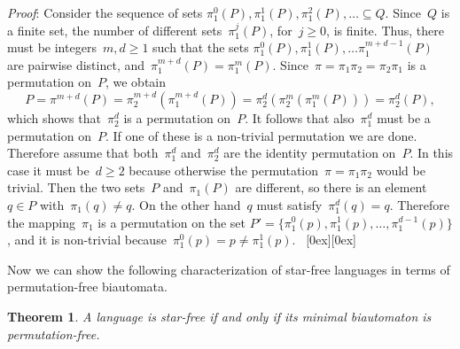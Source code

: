 \documentclass[submission]{eptcs}
\newcommand*{\qed}{\raisebox{0.5ex}[0ex][0ex]{\framebox[1ex][l]{}}}
\newtheorem{theorem}{Theorem}
\newenvironment{proof}{\par\noindent
  {\rmfamily\itshape\mdseries Proof\/}:\hspace{\labelsep}\ignorespaces}{\mbox{}\nolinebreak\hfill~{\qed}
  \medbreak
}
\begin{document}
\begin{proof}
  Consider the sequence of sets $\pi_1^0(P), \pi_1^1(P), \pi_1^2(P),
  \ldots \subseteq Q$.  Since~$Q$ is a finite set, the number of
  different sets~$\pi_1^j(P)$, for~$j\geq 0$, is finite.  Thus, there
  must be integers~$m,d\geq 1$ such that the sets $\pi_1^0(P),
  \pi_1^1(P), \dots \pi_1^{m+d-1}(P)$ are pairwise distinct,
  and~$\pi_1^{m+d}(P) = \pi_1^m(P)$.  Since~$\pi =
  \pi_1\pi_2=\pi_2\pi_1$ is a permutation on~$P$, we obtain
\[ P=\pi^{m+d}(P) = \pi_2^{m+d}(\pi_1^{m+d}(P)) = \pi_2^d ( \pi_2^m
  ( \pi_1^m (P))) = \pi_2^d (P), \]
which shows that~$\pi_2^d$ is a permutation on~$P$.  It follows that
  also~$\pi_1^d$ must be a permutation on~$P$.  If one of these is a
  non-trivial permutation we are done.  
Therefore assume that both~$\pi_1^d$ and~$\pi_2^d$ are the identity
  permutation on~$P$.  In this case it must be~$d\geq 2$ because
  otherwise the permutation~$\pi=\pi_1\pi_2$ would be trivial.  Then
  the two sets~$P$ and~$\pi_1(P)$ are different, so there is an
  element~$q\in P$ with~$\pi_1(q)\neq q$.  On the other hand~$q$ must
  satisfy~$\pi_1^d(q) = q$.  Therefore the mapping~$\pi_1$ is a
  permutation on the set
  $P'=\{\pi_1^0(p),\pi_1^1(p),\dots,\pi_1^{d-1}(p)\}$, and it is
  non-trivial because~$\pi_1^0(p) = p \neq \pi_1^1(p)$.
\end{proof}

Now we can show the following characterization of star-free languages
in terms of permutation-free biautomata.

\begin{theorem}\label{thm:star-free-permutation-free}
  A language is star-free if and only if its \emph{minimal}
  biautomaton is permutation-free.
\end{theorem}
\end{document}
